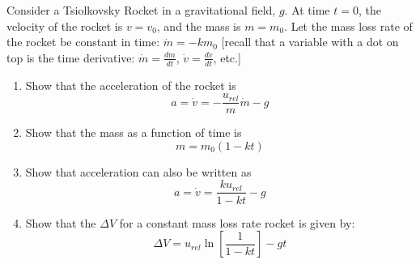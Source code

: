 \documentclass{article}
\begin{document}
Consider a Tsiolkovsky Rocket in a gravitational field, $ g $. At time $ t = 0 $, the velocity of the rocket is $ v = v_0 $, and the mass is $ m = m_0 $. Let the mass loss rate of the rocket be constant in time: $ \dot{m} = -km_0 $ [recall that a variable with a dot on top is the time derivative: $ \dot{m} = \frac{dm}{dt} $, $ \dot{v} = \frac{dv}{dt} $, etc.]
\begin{enumerate}[label = \textbf{\arabic*.}]
	\item Show that the acceleration of the rocket is
		\begin{equation*}
			a = \dot{v} = -\frac{u_{rel}}{m}\dot{m} - g
		\end{equation*}
	\item Show that the mass as a function of time is
		\begin{equation*}
			m = m_0(1 - kt)
		\end{equation*}
	\item Show that acceleration can also be written as
		\begin{equation*}
			a = \dot{v} = \frac{ku_{rel}}{1 - kt} - g
		\end{equation*}
	\item Show that the $ \Delta V $ for a constant mass loss rate rocket is given by:
		\begin{equation*}
			\Delta V = u_{rel}\ln \left[ \frac{1}{1 - kt} \right] - gt
		\end{equation*}
\end{enumerate}
\end{document}
